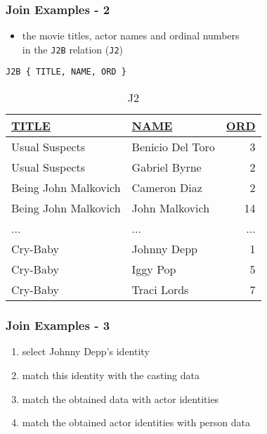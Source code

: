 \documentclass[dvipsnames]{beamer}
\theoremstyle{plain}
\begin{document}
\begin{frame}[fragile]
  \frametitle{Join Examples - 2}

  \begin{example}
    \begin{itemize}
      \item the movie titles, actor names and ordinal numbers\\
        in the \texttt{J2B} relation (\texttt{J2})
    \end{itemize}

    \begin{lstlisting}
J2B { TITLE, NAME, ORD }
    \end{lstlisting}

    \pause
    \vspace{-10pt}
    \begin{tiny}
    \begin{table}
      \caption{J2}
      \begin{tabular}{|l|l|r|}\hline
\underline{TITLE}    & \underline{NAME} & \underline{ORD}\\[2pt]\hline\hline
Usual Suspects       & Benicio Del Toro &   3\\\hline
Usual Suspects       & Gabriel Byrne    &   2\\\hline
Being John Malkovich & Cameron Diaz     &   2\\\hline
Being John Malkovich & John Malkovich   &  14\\\hline
...                  & ...              & ...\\\hline
Cry-Baby             & Johnny Depp      &   1\\\hline
Cry-Baby             & Iggy Pop         &   5\\\hline
Cry-Baby             & Traci Lords      &   7\\\hline
      \end{tabular}
    \end{table}
    \end{tiny}
  \end{example}
\end{frame}

\begin{frame}
  \frametitle{Join Examples - 3}

  \begin{example}
    \pause
    \begin{enumerate}
      \item select Johnny Depp's identity

      \pause
      \item match this identity with the casting data

      \pause
      \item match the obtained data with actor identities

      \pause
      \item match the obtained actor identities with person data
    \end{enumerate}
  \end{example}
\end{frame}
\end{document}

